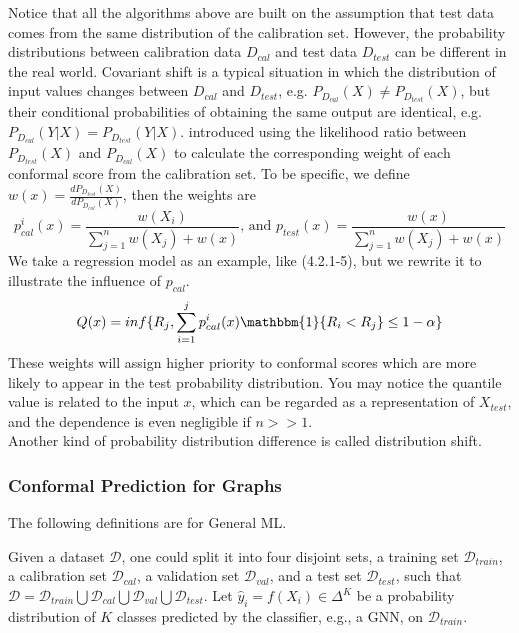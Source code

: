 \noindent Notice that all the algorithms above are built on the assumption that test data comes from the same distribution of the calibration set. However, the probability distributions between calibration data $D_{cal}$ and test data $D_{test}$ can be different in the real world. Covariant shift is a typical situation in which the distribution of input values changes between $D_{cal}$ and $D_{test}$, e.g. $P_{D_{cal}}(X)\neq P_{D_{test}}(X)$, but their conditional probabilities of obtaining the same output are identical, e.g. $P_{D_{cal}}(Y|X) = P_{D_{test}}(Y|X)$.  \cite{tibshirani2019conformal} introduced using the likelihood ratio between $P_{D_{test}}(X)$ and $P_{D_{cal}}(X)$ to calculate the corresponding weight of each conformal score from the calibration set. To be specific, we define $w(x)=\frac{dP_{D_{test}}(X)}{dP_{D_{cal}}(X)}$, then the weights are
\begin{equation}
p_{cal}^i(x)=\frac{w(X_i)}{\sum_{j=1}^n w(X_j)+w(x)}\text{, and } p_{test}(x)=\frac{w(x)}{\sum_{j=1}^n w(X_j)+w(x)}
\end{equation}
We take a regression model as an example, like (4.2.1-5), but we rewrite it to illustrate the influence of $p_{cal}$.
\begin{equation}
Q(x) = inf\{R_j,\sum_{i=1}^j p_{cal}^i(x)\mathbbm{1}\{R_i<R_j\}\leq 1-\alpha \}
\end{equation}
These weights will assign higher priority to conformal scores which are more likely to appear in the test probability distribution.  You may notice the quantile value is related to the input $x$, which can be regarded as a representation of $X_{test}$, and the dependence is even negligible if $n>>1$. \\

\noindent Another kind of probability distribution difference is called distribution shift.  
\subsubsection{Conformal Prediction for Graphs}
The following definitions are for General ML.

Given a dataset $\mathcal{D}$, one could split it into four disjoint sets, a training set $\mathcal{D}_{train}$, a calibration set $\mathcal{D}_{cal}$, a validation set $\mathcal{D}_{val}$, and a test set $\mathcal{D}_{test}$, such that $\mathcal{D} = \mathcal{D}_{train} \bigcup \mathcal{D}_{cal} \bigcup \mathcal{D}_{val} \bigcup \mathcal{D}_{test}$.
Let $\hat{y}_i= f(X_i) \in \Delta^K$ be a probability distribution of $K$ classes predicted by the classifier, e.g., a GNN, on $\mathcal{D}_{train}$.
% 

